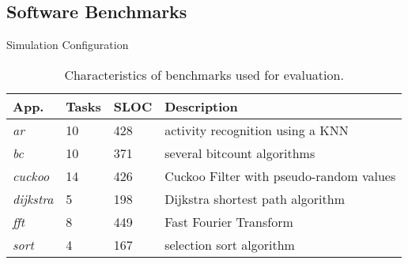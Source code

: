 \subsection{Software Benchmarks}
\label{sec:software_benchmarks}

\begin{table}%
\caption{Simulation Configuration}
\label{tab:one}
\begin{minipage}{\columnwidth}
\begin{center}
\begin{tabular}{llll}
  \toprule
		App.&Tasks&SLOC&Description\\
		\hline
        \emph{ar} &10 &428 & activity recognition using a KNN\\ %
        \emph{bc} &10 &371 & several bitcount algorithms\\
        \emph{cuckoo} &14 &426 & Cuckoo Filter with pseudo-random values\\
        \emph{dijkstra} &5 &198 & Dijkstra shortest path algorithm \\
        \emph{fft} &8 &449 & Fast Fourier Transform\\ %
		\emph{sort} &4 &167 & selection sort algorithm\\
  \bottomrule
\end{tabular}
\end{center}
\end{minipage}
\caption{Characteristics of benchmarks used for evaluation.}
\label{table:benchmark_table}
\end{table}%

